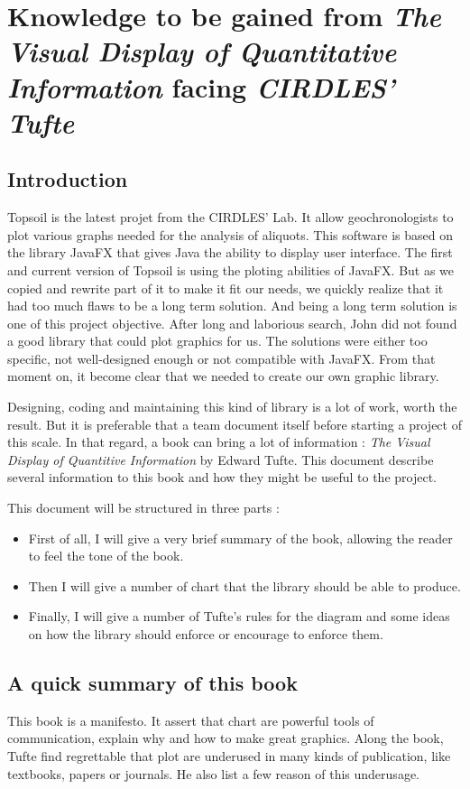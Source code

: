\chapter{Knowledge to be gained from \textit{The Visual Display of Quantitative Information} facing \textit{CIRDLES' Tufte}}

\section{Introduction}
Topsoil is the latest projet from the CIRDLES' Lab. It allow geochronologists to plot various graphs needed for the analysis of aliquots. This software is based on the library JavaFX that gives Java the ability to display user interface.
The first and current version of Topsoil is using the ploting abilities of JavaFX. But as we copied and rewrite part of it to make it fit our needs, we quickly realize that it had too much flaws to be a long term solution. And being a long term solution is one of this project objective.
After long and laborious search, John did not found a good library that could plot graphics for us. The solutions were either too specific, not well-designed enough or not compatible with JavaFX. From that moment on, it become clear that we needed to create our own graphic library. 

Designing, coding and maintaining this kind of library is a lot of work, worth the result. But it is preferable that a team document itself before starting a project of this scale. 
In that regard, a book can bring a lot of information : \textit{The Visual Display of Quantitive Information} by Edward Tufte. This document describe several information to this book and how they might be useful to the project. %

This document will be structured in three parts : 
\begin{itemize}
\item First of all, I will give a very brief summary of the book, allowing the reader to feel the tone of the book.
\item Then I will give a number of chart that the library should be able to produce.
\item Finally, I will give a number of Tufte's rules for the diagram and some ideas on how the library should enforce or encourage to enforce them. 
\end{itemize}
\section{A quick summary of this book}
This book is a manifesto. It assert that chart are powerful tools of communication, explain why and how to make great graphics.
Along the book, Tufte find regrettable that plot are underused in many kinds of publication, like textbooks, papers or journals. He also list a few reason of this underusage.

